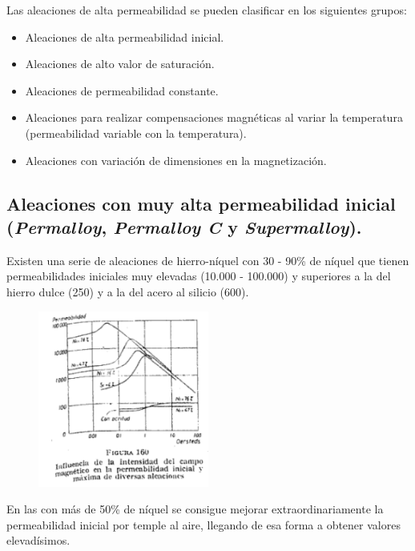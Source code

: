 \documentclass[12pt,a4paper]{article}
\begin{document}
Las aleaciones de alta permeabilidad se pueden clasificar en los siguientes grupos:

\begin{itemize}
    \item Aleaciones de alta permeabilidad inicial.
    \item Aleaciones de alto valor de saturación.
    \item Aleaciones de permeabilidad constante.
    \item Aleaciones para realizar compensaciones magnéticas al variar la temperatura (permeabilidad variable con la temperatura).
    \item Aleaciones con variación de dimensiones en la magnetización.
\end{itemize}

\subsection{Aleaciones con muy alta permeabilidad inicial (\textit{Permalloy}, \textit{Permalloy C} y \textit{Supermalloy}).}

Existen una serie de aleaciones de hierro-níquel con 30 - 90\% de níquel que tienen permeabilidades iniciales muy elevadas (10.000 - 100.000) y superiores a la del hierro dulce (250) y a la del acero al silicio (600).

\begin{figure}[H]    
    \centering         
    \includegraphics[width=0.5\textwidth]{IMAGENES LATEX/7.png}
\end{figure}

En las con más de 50\% de níquel se consigue mejorar extraordinariamente la permeabilidad inicial por temple al aire, llegando de esa forma a obtener valores elevadísimos. 
\end{document}
